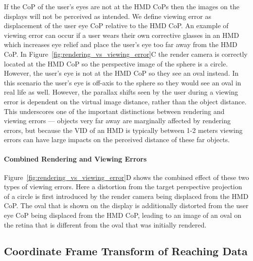 \documentclass[acmlarge, nonacm]{acmart}
\begin{document}
If the CoP of the user's eyes are not at the HMD CoPs then the images on the displays will not be perceived as intended. We define viewing error as displacement of the user eye CoP relative to the HMD CoP. An example of viewing error can occur if a user wears their own corrective glasses in an HMD which increases eye relief and place the user's eye too far away from the HMD CoP. In Figure~\ref{fig:rendering_vs_viewing_error}C the render camera is correctly located at the HMD CoP so the perspective image of the sphere is a circle. However, the user's eye is not at the HMD CoP so they see an oval instead. In this scenario the user's eye is off-axis to the sphere so they would see an oval in real life as well. However, the parallax shifts seen by the user during a viewing error is dependent on the virtual image distance, rather than the object distance. This underscores one of the important distinctions between rendering and viewing errors — objects very far away are marginally affected by rendering errors, but because the VID of an HMD is typically between 1-2 meters viewing errors can have large impacts on the perceived distance of these far objects.

\paragraph{Combined Rendering and Viewing Errors}
Figure~\ref{fig:rendering_vs_viewing_error}D shows the combined effect of these two types of viewing errors. Here a distortion from the target perspective projection of a circle is first introduced by the render camera being displaced from the HMD CoP. The oval that is shown on the display is additionally distorted from the user eye CoP being displaced from the HMD CoP, leading to an image of an oval on the retina that is different from the oval that was initially rendered. %

\subsection{Coordinate Frame Transform of Reaching Data}
\end{document}
